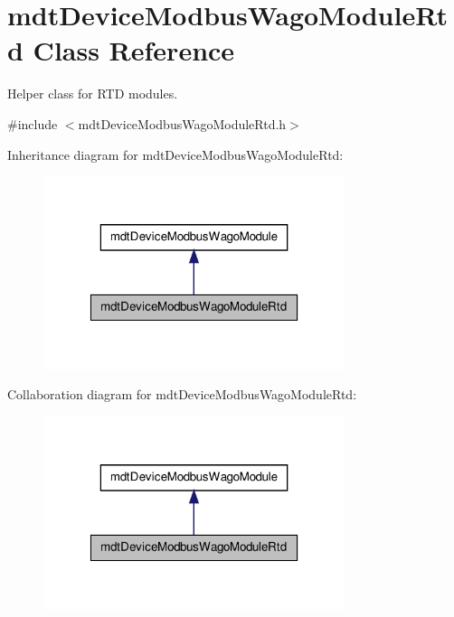 \hypertarget{classmdt_device_modbus_wago_module_rtd}{\section{mdt\-Device\-Modbus\-Wago\-Module\-Rtd Class Reference}
\label{classmdt_device_modbus_wago_module_rtd}
}


Helper class for R\-T\-D modules.  




{\ttfamily \#include $<$mdt\-Device\-Modbus\-Wago\-Module\-Rtd.\-h$>$}



Inheritance diagram for mdt\-Device\-Modbus\-Wago\-Module\-Rtd\-:
\nopagebreak
\begin{figure}[H]
\begin{center}
\leavevmode
\includegraphics[width=250pt]{classmdt_device_modbus_wago_module_rtd__inherit__graph}
\end{center}
\end{figure}


Collaboration diagram for mdt\-Device\-Modbus\-Wago\-Module\-Rtd\-:
\nopagebreak
\begin{figure}[H]
\begin{center}
\leavevmode
\includegraphics[width=250pt]{classmdt_device_modbus_wago_module_rtd__coll__graph}
\end{center}
\end{figure}
